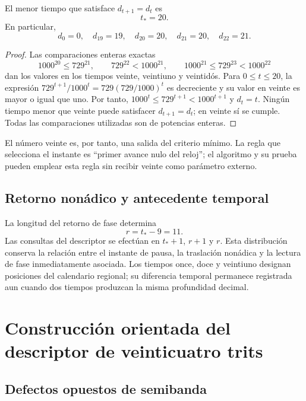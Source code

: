 \begin{proposition}
El menor tiempo que satisface $d_{t+1}=d_t$ es
\[
 t_*=20.
\]
En particular,
\[
 d_0=0,\quad d_{19}=19,\quad d_{20}=20,
 \quad d_{21}=20,\quad d_{22}=21.
\]
\end{proposition}
\begin{proof}
Las comparaciones enteras exactas
\[
 1000^{20}\leq729^{21},\qquad
 729^{22}<1000^{21},\qquad
 1000^{21}\leq729^{23}<1000^{22}
\]
dan los valores en los tiempos veinte, veintiuno y veintidós. Para
$0\leq t\leq20$, la expresión
$729^{t+1}/1000^t=729(729/1000)^t$ es decreciente y su valor en veinte
es mayor o igual que uno. Por tanto,
$1000^t\leq729^{t+1}<1000^{t+1}$ y $d_t=t$. Ningún tiempo menor que
veinte puede satisfacer $d_{t+1}=d_t$; en veinte sí se cumple.
Todas las comparaciones utilizadas son de potencias enteras.
\end{proof}

El número veinte es, por tanto, una salida del criterio mínimo. La regla
que selecciona el instante es ``primer avance nulo del reloj''; el
algoritmo y su prueba pueden emplear esta regla sin recibir veinte como
parámetro externo.

\subsection{Retorno nonádico y antecedente temporal}

La longitud del retorno de fase determina
\begin{equation}
 r=t_*-9=11.
 \label{eq:kdes-retorno}
\end{equation}
Las consultas del descriptor se efectúan en $t_*+1$, $r+1$ y $r$.
Esta distribución conserva la relación entre el instante de pausa, la
traslación nonádica y la lectura de fase inmediatamente asociada. Los
tiempos once, doce y veintiuno designan posiciones del calendario
regional; su diferencia temporal permanece registrada aun cuando dos
tiempos produzcan la misma profundidad decimal.

\section{Construcción orientada del descriptor de veinticuatro trits}

\subsection{Defectos opuestos de semibanda}

